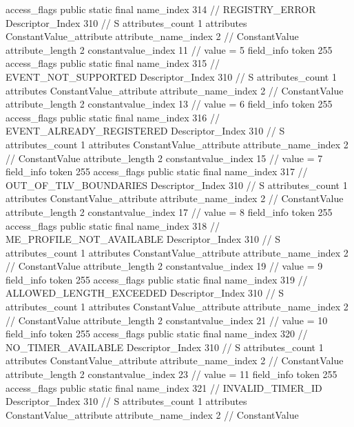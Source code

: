 {{{{{				access_flags	public static final
				name_index	314		// REGISTRY_ERROR
				Descriptor_Index	310		// S
				attributes_count	1
				attributes {
				ConstantValue_attribute {
					attribute_name_index	2		// ConstantValue
					attribute_length	2
					constantvalue_index	11		// value = 5
				}
				}
			}
			field_info {
				token	255
				access_flags	public static final
				name_index	315		// EVENT_NOT_SUPPORTED
				Descriptor_Index	310		// S
				attributes_count	1
				attributes {
				ConstantValue_attribute {
					attribute_name_index	2		// ConstantValue
					attribute_length	2
					constantvalue_index	13		// value = 6
				}
				}
			}
			field_info {
				token	255
				access_flags	public static final
				name_index	316		// EVENT_ALREADY_REGISTERED
				Descriptor_Index	310		// S
				attributes_count	1
				attributes {
				ConstantValue_attribute {
					attribute_name_index	2		// ConstantValue
					attribute_length	2
					constantvalue_index	15		// value = 7
				}
				}
			}
			field_info {
				token	255
				access_flags	public static final
				name_index	317		// OUT_OF_TLV_BOUNDARIES
				Descriptor_Index	310		// S
				attributes_count	1
				attributes {
				ConstantValue_attribute {
					attribute_name_index	2		// ConstantValue
					attribute_length	2
					constantvalue_index	17		// value = 8
				}
				}
			}
			field_info {
				token	255
				access_flags	public static final
				name_index	318		// ME_PROFILE_NOT_AVAILABLE
				Descriptor_Index	310		// S
				attributes_count	1
				attributes {
				ConstantValue_attribute {
					attribute_name_index	2		// ConstantValue
					attribute_length	2
					constantvalue_index	19		// value = 9
				}
				}
			}
			field_info {
				token	255
				access_flags	public static final
				name_index	319		// ALLOWED_LENGTH_EXCEEDED
				Descriptor_Index	310		// S
				attributes_count	1
				attributes {
				ConstantValue_attribute {
					attribute_name_index	2		// ConstantValue
					attribute_length	2
					constantvalue_index	21		// value = 10
				}
				}
			}
			field_info {
				token	255
				access_flags	public static final
				name_index	320		// NO_TIMER_AVAILABLE
				Descriptor_Index	310		// S
				attributes_count	1
				attributes {
				ConstantValue_attribute {
					attribute_name_index	2		// ConstantValue
					attribute_length	2
					constantvalue_index	23		// value = 11
				}
				}
			}
			field_info {
				token	255
				access_flags	public static final
				name_index	321		// INVALID_TIMER_ID
				Descriptor_Index	310		// S
				attributes_count	1
				attributes {
				ConstantValue_attribute {
					attribute_name_index	2		// ConstantValue
}}}}}}}
